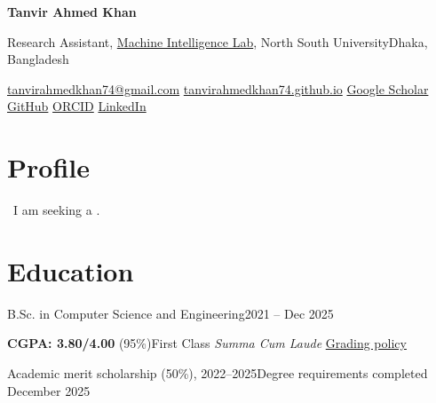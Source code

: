 \documentclass[a4paper,11pt]{article}
\newcommand{\profileStart}{%
\begin{description}[style=multiline,leftmargin=3.55cm,labelwidth=3.4cm,labelsep=0.15cm,
                    font=\sffamily\bfseries\fontsize{9.2pt}{11pt}\selectfont,
                    itemsep=3pt,topsep=0pt,parsep=0pt,partopsep=0pt]}
\newcommand{\profileEnd}{\end{description}}
\begin{document}
\begin{center}
{\sffamily\bfseries\fontsize{21pt}{24pt}\selectfont Tanvir Ahmed Khan}\par
\vspace{3pt}
{\small Research Assistant, \href{https://milab-nsu.github.io/}{Machine Intelligence Lab},
North South University\enspace\textbullet\enspace Dhaka, Bangladesh}\par
\vspace{2pt}
{\small \href{mailto:tanvirahmedkhan74@gmail.com}{tanvirahmedkhan74@gmail.com}
\enspace\textbullet\enspace
\href{https://tanvirahmedkhan74.github.io/}{tanvirahmedkhan74.github.io}\enspace\textbullet\enspace
\href{https://scholar.google.com/citations?user=Q5rEac8AAAAJ\&hl=en}{Google Scholar}
\enspace\textbullet\enspace
\href{https://github.com/tanvirahmedkhan74}{GitHub}\enspace\textbullet\enspace
\href{https://orcid.org/0009-0009-0519-8021}{ORCID}\enspace\textbullet\enspace
\href{https://www.linkedin.com/in/tanvir-ahmed-khan-98654835a/}{LinkedIn}}
\end{center}

\section{Profile}
{\RaggedRight{}\relax
\cvProfile\ I am seeking a
\textbf{\cvSeeking}.
\par}
\vspace{4pt}
\profileStart
\cvInterests
\profileEnd

\section{Education}
{B.Sc. in Computer Science and Engineering}{2021 -- Dec 2025}
\par\vspace{-1.5pt}
{\small\RaggedRight
\textbf{CGPA: 3.80/4.00} (95\%)\enspace\textbar\enspace First Class\enspace\textbar\enspace
\textit{Summa Cum Laude}\enspace\textbar\enspace
\href{https://www.northsouth.edu/academic/grading-policy.html}{Grading policy}\par
\vspace{1.5pt}
Academic merit scholarship (50\%), 2022--2025\enspace\textbar\enspace Degree requirements
completed December 2025\par}
\end{document}

